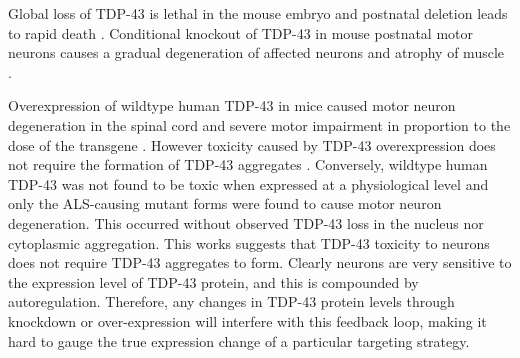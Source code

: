 Global loss of TDP-43 is lethal in the mouse embryo \citep{Kraemer2010} and postnatal deletion leads to rapid death \citep{Chiang2010}. 
Conditional knockout of TDP-43 in mouse postnatal motor neurons causes a gradual degeneration of affected neurons and atrophy of muscle \citep{Iguchi2013}. 

Overexpression of wildtype human TDP-43 in mice caused motor neuron degeneration in the spinal cord and severe motor impairment in proportion to the dose of the transgene \citep{Wils2010, Shan2010}.
However toxicity caused by TDP-43 overexpression does not require the formation of TDP-43 aggregates \citep{Wegorzewska2009, Barmada2010}.
Conversely, wildtype human TDP-43 was not found to be toxic when expressed at a physiological level \citep{Arnold2013} and only the ALS-causing mutant forms were found to cause motor neuron degeneration. 
This occurred without observed TDP-43 loss in the nucleus nor cytoplasmic aggregation. 
This works suggests that TDP-43 toxicity to neurons does not require TDP-43 aggregates to form.
Clearly neurons are very sensitive to the expression level of TDP-43 protein, and this is compounded by autoregulation. 
Therefore, any changes in TDP-43 protein levels through knockdown or over-expression will interfere with this feedback loop, making it hard to gauge the true expression change of a particular targeting strategy. 








%


